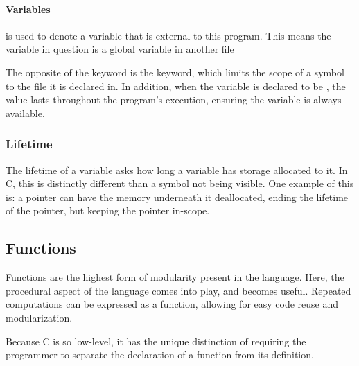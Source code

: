 \paragraph{\texorpdfstring{}{\texttt{extern}} Variables}\label{par:extern_Variables}
 is used to denote a variable that is external to this program.
This means the variable in question is a global variable in another file

The opposite of the  keyword is the  keyword, which limits the scope of a symbol to the file it is declared in.
In addition, when the variable is declared to be , the value lasts throughout the program's execution, ensuring the variable is always available.

\subsubsection{Lifetime}\label{subsubsec:Variable_Lifetime}
The lifetime of a variable asks how long a variable has storage allocated to it.
In C, this is distinctly different than a symbol not being visible.
One example of this is: a pointer can have the memory underneath it deallocated, ending the lifetime of the pointer, but keeping the pointer in-scope.

\subsection{Functions}\label{subsec:Functions}
Functions are the highest form of modularity present in the language.
Here, the procedural aspect of the language comes into play, and becomes useful.
Repeated computations can be expressed as a function, allowing for easy code reuse and modularization.

Because C is so low-level, it has the unique distinction of requiring the programmer to separate the declaration of a function from its definition.


